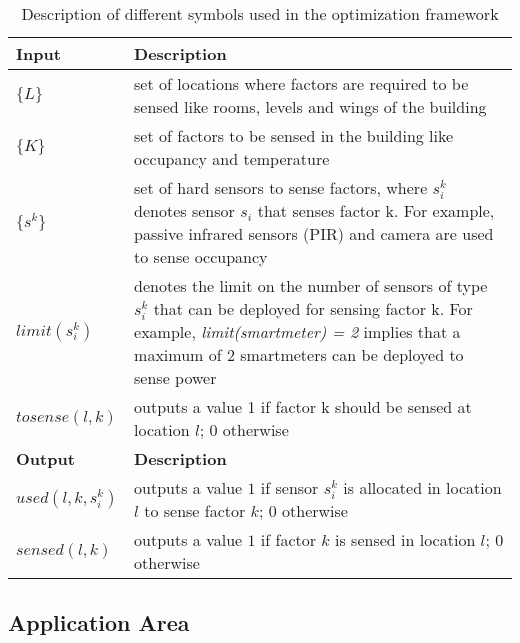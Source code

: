 \documentclass[]{interact}
\theoremstyle{plain}%
\theoremstyle{definition}
\theoremstyle{remark}
\begin{document}
\begin{table}[h]
\caption{Description of different symbols used in the optimization framework}
	\centering
	\begin{tabular}{p{}  p{}}
		\toprule
		\textbf{Input} & \textbf{Description}
		\\ \midrule
		$\{L\}$                           & set of locations where factors are required to be sensed like rooms, levels and wings of the building
		\\ \hline
		$ \{K\} $                         & set of factors to be sensed in the building like occupancy and temperature
    \\ \hline
    $\{s^k\}$ & set of hard sensors to sense factors, where $s_i^k$ denotes sensor $s_i$ that senses factor k. For example, passive infrared sensors (PIR) and camera are used to sense occupancy
    \\ \hline
    $limit(s_i^k)$ & denotes the limit on the number of sensors of type $s_i^k$ that can be deployed for sensing factor k. For example, \textit{limit(smartmeter) = 2} implies that a maximum of 2 smartmeters can be deployed to sense power
    \\ \hline
    $tosense(l,k)$ & outputs a value 
    1 if factor k should be sensed at location $l$; 0 otherwise
    \\ \midrule
    \textbf{Output} & \textbf{Description} 
    \\ \midrule
    $used(l,k,s_i^k)$  &  outputs a value $1$ if sensor $s_i^k$ is allocated in location $l$ to sense factor $k$; $0$ otherwise 
    \\ \hline
    $sensed(l,k)$    & outputs a value $1$ if factor $k$ is sensed in location $l$; $0$ otherwise
    \\ \bottomrule
	\end{tabular}
	\label{tab:var}
\end{table}

\subsection{Application Area}
\end{document}
